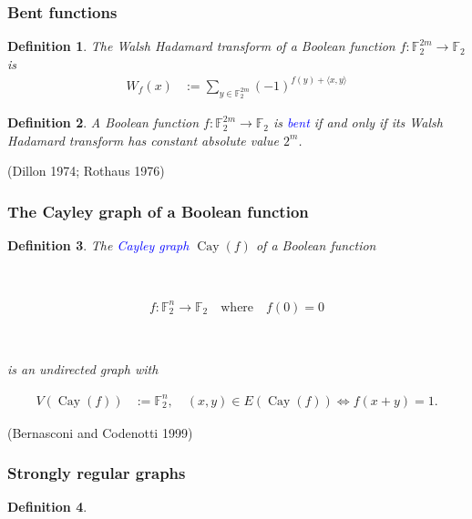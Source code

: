 \documentclass[pdf,sprung,slideColor,nocolorBG]{beamer}
\newenvironment{colortheme}[1]{
\def\ProvidesPackageRCS $##1${\relax}
\renewcommand{\ProcessOptions}{\relax}
\makeatletter

\makeatother
}{}
\newcommand{\slidecite}[1]{\tiny{(#1)}\normalsize{}}
\newcommand{\mb}[1]{\mathbb{#1}}
\newcommand{\Emph}[1]{\emph{\textcolor{blue}{#1}}}
\newcommand{\To}{\rightarrow}
\newcommand{\Cay}[1]{\operatorname{Cay}\left(#1\right)}
\newcommand{\F}{\mb{F}}
\newtheorem{Def}{Definition}
\begin{document}
\begin{colortheme}{seagull}

\begin{frame}
\frametitle{Bent functions}
\begin{Def}
\label{def-Walsh-Hadamard-transform}
The Walsh Hadamard transform of
a Boolean function $f : \F_2^{2m} \To \F_2$ is
\begin{align*}
W_f(x)
&:=
\sum_{y \in \F_2^{2m}} (-1)^{f(y) + \langle x, y \rangle}
\end{align*}
\end{Def}

\begin{Def}
\label{def-Bent-function}
A Boolean function $f : \F_2^{2m} \To \F_2$ is \Emph{bent}
if and only if its Walsh Hada\-mard transform has constant absolute value $2^{m}$.
\end{Def}
\slidecite{Dillon 1974; Rothaus 1976}
\end{frame}

\begin{frame}
\frametitle{The Cayley graph of a Boolean function}
\begin{Def}

The \Emph{Cayley graph} $\Cay{f}$ of a Boolean function

~

\begin{align*}
%
f : \F_2^n \To \F_2 \quad \text{where} \quad f(0) = 0
%
\end{align*}

~

is
an undirected graph with

\begin{align*}
V(\Cay{f}) &:= \F_2^n, \quad (x,y) \in E(\Cay{f}) \Leftrightarrow f(x+y) = 1.
\end{align*}

\end{Def}

\slidecite{Bernasconi and Codenotti 1999}
\end{frame}

\begin{frame}
\frametitle{Strongly regular graphs}
\begin{Def}


\end{Def}
\end{frame}
\end{colortheme}
\end{document}
